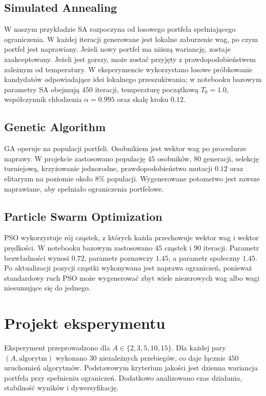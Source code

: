 \documentclass[12pt,a4paper]{article}
\begin{document}
\subsection{Simulated Annealing}
W naszym przykładzie SA rozpoczyna od losowego portfela spełniającego ograniczenia. W każdej iteracji generowane jest lokalne zaburzenie wag, po czym portfel jest naprawiany. Jeżeli nowy portfel ma niższą wariancję, zostaje zaakceptowany. Jeżeli jest gorszy, może zostać przyjęty z prawdopodobieństwem zależnym od temperatury. W eksperymencie wykorzystano losowe próbkowanie kandydatów odpowiadające idei lokalnego przeszukiwania; w notebooku bazowym parametry SA obejmują $450$ iteracji, temperaturę początkową $T_0=1.0$, współczynnik chłodzenia $\alpha=0.995$ oraz skalę kroku $0.12$.

\subsection{Genetic Algorithm}
GA operuje na populacji portfeli. Osobnikiem jest wektor wag po procedurze naprawy. W projekcie zastosowano populację $45$ osobników, $80$ generacji, selekcję turniejową, krzyżowanie jednorodne, prawdopodobieństwo mutacji $0.12$ oraz elitaryzm na poziomie około $8\%$ populacji. Wygenerowane potomstwo jest zawsze naprawiane, aby spełniało ograniczenia portfelowe.

\subsection{Particle Swarm Optimization}
PSO wykorzystuje rój cząstek, z których każda przechowuje wektor wag i wektor prędkości. W notebooku bazowym zastosowano $45$ cząstek i $90$ iteracji. Parametr bezwładności wynosi $0.72$, parametr poznawczy $1.45$, a parametr społeczny $1.45$. Po aktualizacji pozycji cząstki wykonywana jest naprawa ograniczeń, ponieważ standardowy ruch PSO może wygenerować zbyt wiele niezerowych wag albo wagi niesumujące się do jednego.

\section{Projekt eksperymentu}
Eksperyment przeprowadzono dla $A \in \{2,3,5,10,15\}$. Dla każdej pary $(A,\text{algorytm})$ wykonano $30$ niezależnych przebiegów, co daje łącznie $450$ uruchomień algorytmów. Podstawowym kryterium jakości jest dzienna wariancja portfela przy spełnieniu ograniczeń. Dodatkowo analizowano czas działania, stabilność wyników i dywersyfikację.
\end{document}
